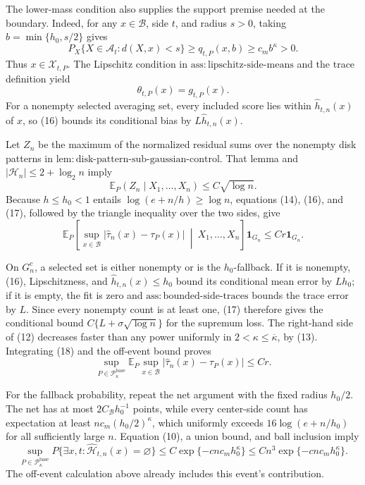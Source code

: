 The lower-mass condition also supplies the support premise needed at the boundary. Indeed, for any \(x\in\mathcal B\), side \(t\), and radius \(s>0\), taking \(b=\min\{h_0,s/2\}\) gives
\[
 P_X\{X\in\mathcal A_t:d(X,x)<s\}
 \ge q_{t,P}(x,b)\ge c_mb^\kappa>0. \tag{15}
\]
Thus \(x\in\mathcal X_{t,P}\). The Lipschitz condition in \(\mathrm{ass:lipschitz\text{-}side\text{-}means}\) and the trace definition yield
\[
 \theta_{t,P}(x)=g_{t,P}(x). \tag{16}
\]
For a nonempty selected averaging set, every included score lies within \(\widehat h_{t,n}(x)\) of \(x\), so (16) bounds its conditional bias by \(L\widehat h_{t,n}(x)\).

Let \(Z_n\) be the maximum of the normalized residual sums over the nonempty disk patterns in \(\mathrm{lem:disk\text{-}pattern\text{-}sub\text{-}gaussian\text{-}control}\). That lemma and \(|\mathcal H_n|\le 2+\log_2 n\) imply
\[
 \mathbb E_P(Z_n\mid X_1,\ldots,X_n)\le C\sqrt{\log n}. \tag{17}
\]
Because \(h\le h_0<1\) entails \(\log(e+n/h)\ge\log n\), equations (14), (16), and (17), followed by the triangle inequality over the two sides, give
\[
 \mathbb E_P\!\left[\sup_{x\in\mathcal B}|\widehat\tau_n(x)-\tau_P(x)|
 \ \middle|\ X_1,\ldots,X_n\right]\mathbf 1_{G_n}
 \le Cr\mathbf 1_{G_n}. \tag{18}
\]

On \(G_n^c\), a selected set is either nonempty or is the \(h_0\)-fallback. If it is nonempty, (16), Lipschitzness, and \(\widehat h_{t,n}(x)\le h_0\) bound its conditional mean error by \(Lh_0\); if it is empty, the fit is zero and \(\mathrm{ass:bounded\text{-}side\text{-}traces}\) bounds the trace error by \(L\). Since every nonempty count is at least one, (17) therefore gives the conditional bound \(C\{L+\sigma\sqrt{\log n}\}\) for the supremum loss. The right-hand side of (12) decreases faster than any power uniformly in \(2<\kappa\le\overline\kappa\), by (13). Integrating (18) and the off-event bound proves
\[
 \sup_{P\in\mathcal P_{\kappa}^{\mathrm{base}}}
 \mathbb E_P\sup_{x\in\mathcal B}|\widehat\tau_n(x)-\tau_P(x)|
 \le Cr. \tag{19}
\]

For the fallback probability, repeat the net argument with the fixed radius \(h_0/2\). The net has at most \(2C_{\mathcal B}h_0^{-1}\) points, while every center-side count has expectation at least \(nc_m(h_0/2)^\kappa\), which uniformly exceeds \(16\log(e+n/h_0)\) for all sufficiently large \(n\). Equation (10), a union bound, and ball inclusion imply
\[
 \sup_{P\in\mathcal P_{\kappa}^{\mathrm{base}}}
 P\{\exists x,t:\widehat{\mathcal H}_{t,n}(x)=\varnothing\}
 \le C\exp\{-c n c_mh_0^\kappa\}
 \le Cn^3\exp\{-c n c_mh_0^\kappa\}. \tag{20}
\]
The off-event calculation above already includes this event's contribution.

